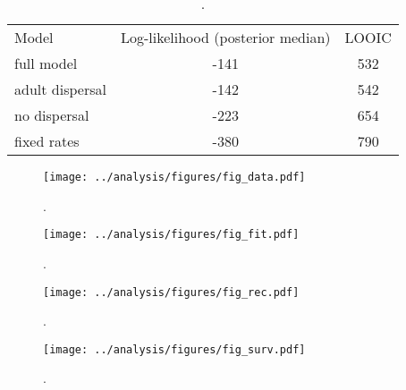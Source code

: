 \documentclass[11pt]{article}
\begin{document}
\clearpage
\begin{table}
\caption{\label{tab:compare}
.
}
\setlength{\tabcolsep}{12pt}
\begin{tabular}{lcc}
\toprule
Model                  &    Log-likelihood (posterior median) & LOOIC \\
\cmidrule{1-3}
full model             & -141 & 532 \\
adult dispersal        & -142 & 542 \\
no dispersal           & -223 & 654 \\
fixed rates            & -380 & 790 \\
\bottomrule
\end{tabular}
\end{table}
\clearpage

\clearpage
\begin{figure}
\centering
\texttt{[image: ../analysis/figures/fig\_data.pdf]}
\caption{\label{fig:data}
.
}
\end{figure}
\clearpage

\clearpage
\begin{figure}
\centering
\texttt{[image: ../analysis/figures/fig\_fit.pdf]}
\caption{\label{fig:fit}
.
}
\end{figure}
\clearpage

\clearpage
\begin{figure}
\centering
\texttt{[image: ../analysis/figures/fig\_rec.pdf]}
\caption{\label{fig:rec}
.
}
\end{figure}
\clearpage

\clearpage
\begin{figure}
\centering
\texttt{[image: ../analysis/figures/fig\_surv.pdf]}
\caption{\label{fig:surv}
.
}
\end{figure}
\clearpage
\end{document}
